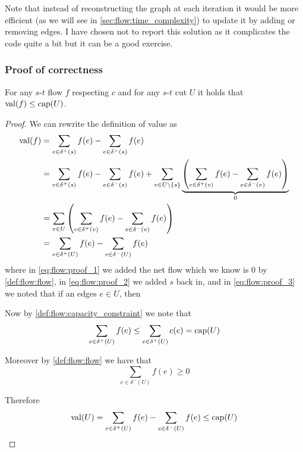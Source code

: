 \documentclass[12pt]{extarticle}
\begin{document}
Note that instead of reconstructing the graph at each iteration it would be more efficient (as we will see in \autoref{sec:flow:time_complexity}) to update it by adding or removing edges.
I have chosen not to report this solution as it complicates the code quite a bit but it can be a good exercise.

\subsubsection{Proof of correctness}

\begin{theorem}
    \label{thm:flow:upper_bound}
    For any $s$-$t$ flow $f$ respecting $c$ and for any $s$-$t$ cut $U$ it holds that ${\operatorfont val}(f) \leq {\operatorfont cap}(U)$.
\end{theorem}

\begin{proof}
    We can rewrite the definition of value as
    \begin{align}
        {\operatorfont val}(f) & = \sum_{e \in \delta^+(s)} f(e) - \sum_{e \in \delta^-(s)} f(e)                                                                                                                                                       \\
                               & = \sum_{e \in \delta^+(s)} f(e) - \sum_{e \in \delta^-(s)} f(e) + \sum_{v \in U \setminus \{s\}} \underbrace{\left( \sum_{e \in \delta^+(v)} f(e) - \sum_{e \in \delta^-(v)} f(e)\right)}_{0} \label{eq:flow:proof_1} \\
                               & = \sum_{v \in U} \left( \sum_{e \in \delta^+(v)} f(e) - \sum_{e \in \delta^-(v)} f(e)\right)  \label{eq:flow:proof_2}                                                                                                 \\
                               & = \sum_{e \in \delta^+(U)} f(e) - \sum_{e \in \delta^-(U)} f(e) \label{eq:flow:proof_3}
    \end{align}
    where in \autoref{eq:flow:proof_1} we added the net flow which we know is $0$ by \autoref{def:flow:flow},
    in \autoref{eq:flow:proof_2} we added $s$ back in,
    and in \autoref{eq:flow:proof_3} we noted that if an edges $e \in U$, then

    Now by \autoref{def:flow:capacity_constraint} we note that
    \begin{equation}
        \sum_{e \in \delta^+(U)} f(e) \leq \sum_{e \in \delta^+(U)} c(e) = {\operatorfont cap}(U)
    \end{equation}

    Moreover by \autoref{def:flow:flow} we have that
    \begin{equation}
        \sum_{e \in \delta^-(U)} f(e) \geq 0
    \end{equation}

    Therefore
    \begin{equation}
        {\operatorfont val}(U) = \sum_{e \in \delta^+(U)} f(e) - \sum_{e \in \delta^-(U)} f(e) \leq {\operatorfont cap}(U)
    \end{equation}
\end{proof}
\end{document}
